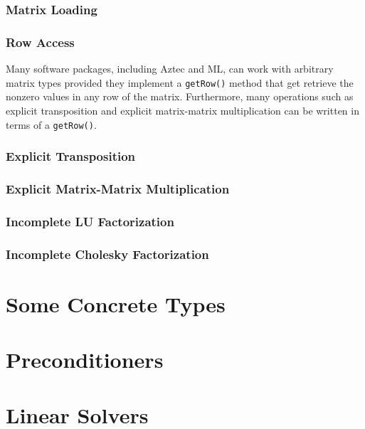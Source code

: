 \subsubsection{Matrix Loading}

\subsubsection{Row Access}

Many software packages, including Aztec and ML, can work with arbitrary matrix types
provided they implement a \verb+getRow()+ method that get retrieve the nonzero
values in any row of the matrix. Furthermore, many operations such as explicit
transposition and explicit matrix-matrix multiplication can be written in terms
of a \verb+getRow()+. 

\subsubsection{Explicit Transposition}

\subsubsection{Explicit Matrix-Matrix Multiplication}

\subsubsection{Incomplete LU Factorization}

\subsubsection{Incomplete Cholesky Factorization}


\section{Some Concrete Types}

\section{Preconditioners}

\section{Linear Solvers}
